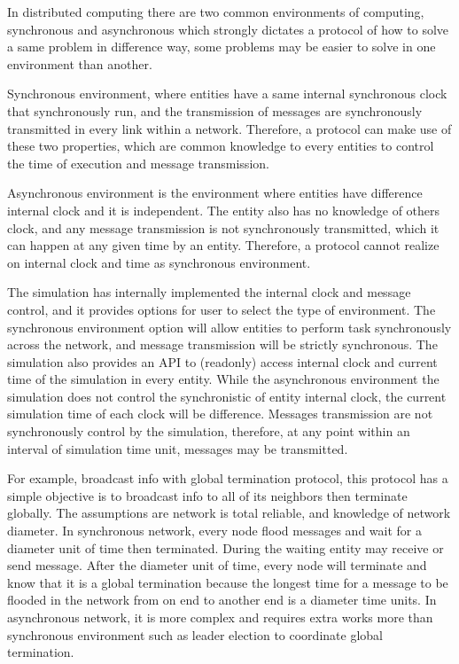 In distributed computing there are two common environments of computing, synchronous and asynchronous which strongly dictates a protocol of how to solve a same problem in difference way, some problems may be easier to solve in one environment than another.

Synchronous environment, where entities have a same internal synchronous clock that synchronously run, and the transmission of messages are synchronously transmitted in every link within a network. Therefore, a protocol can make use of these two properties, which are common knowledge to every entities to control the time of execution and message transmission.

Asynchronous environment is the environment where entities have difference internal clock and it is independent. The entity also has no knowledge of others clock, and any message transmission is not synchronously transmitted, which it can happen at any given time by an entity. Therefore, a protocol cannot realize on internal clock and time as synchronous environment.

The simulation has internally implemented the internal clock and message control, and it provides options for user to select the type of environment. The synchronous environment option will allow entities to perform task synchronously across the network, and message transmission will be strictly synchronous. The simulation also provides an API to (readonly) access internal clock and current time of the simulation in every entity.
While the asynchronous environment the simulation does not control the synchronistic of entity internal clock, the current simulation time of each clock will be difference. Messages transmission are not synchronously control by the simulation, therefore, at any point within an interval of simulation time unit, messages may be transmitted.

For example, broadcast info with global termination protocol, this protocol has a simple objective is to broadcast info to all of its neighbors then terminate globally. The assumptions are network is total reliable, and knowledge of network diameter. In synchronous network, every node flood messages and wait for a diameter unit of time then terminated. During the waiting entity may receive or send message. After the diameter unit of time, every node will terminate and know that it is a global termination because the longest time for a message to be flooded in the network from on end to another end is a diameter time units. In asynchronous network, it is more complex and requires extra works more than synchronous environment such as leader election to coordinate global termination.


